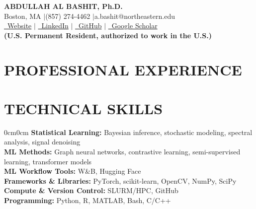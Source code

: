 \documentclass[11pt, letterpaper]{article}
\newlength{\sectionContentAfterSkip}
\newlength{\itemSpacing}
\newlength{\headerAfterSkip}
\newenvironment{onecolentry}{
  \begin{adjustwidth}{0cm}{0cm}
}{
  \end{adjustwidth}
}
\newenvironment{sectioncontent}{
  \par\begin{list}{}{
    \setlength{\leftmargin}{0pt}
    \setlength{\rightmargin}{0pt}
    \setlength{\topsep}{0pt}
    \setlength{\partopsep}{0pt}
    \setlength{\parsep}{0pt}
    \setlength{\itemsep}{0pt}
  }\item\relax
}{
  \removelastskip
  \end{list}
  \vspace{\sectionContentAfterSkip}
  \par
}
\newcommand{\skillitem}[1]{%
  \begin{onecolentry}#1\end{onecolentry}%
  \vspace{\itemSpacing}%
}
\begin{document}
\begin{center}
    {\fontsize{16}{20}\selectfont\bfseries\color{burgundy}ABDULLAH AL BASHIT, Ph.D.}\\[0.2em]
    {\small Boston, MA \enspace$|$\enspace (857) 274-4462 \enspace$|$\enspace a.bashit@northeastern.edu}\\[0.2em]
    {\small \href{https://abdullah-al-bashit.github.io/}{\textcolor{burgundy}{\faGlobe~Website}} \enspace$|$\enspace%
    \href{https://www.linkedin.com/in/abdullah-al-bashit/}{\textcolor{burgundy}{\faLinkedin~LinkedIn}} \enspace$|$\enspace%
    \href{https://github.com/abdullah-al-bashit}{\textcolor{burgundy}{\faGithub~GitHub}} \enspace$|$\enspace%
    \href{https://scholar.google.com/citations?user=w3KyQbkAAAAJ&hl=en}{\textcolor{burgundy}{\faGraduationCap~Google Scholar}}}\\[0.2em]
        {\small \textbf{(U.S. Permanent Resident, authorized to work in the U.S.)}}
\end{center}
\vspace{\headerAfterSkip}

\section{PROFESSIONAL EXPERIENCE}
\begin{sectioncontent}

\expVesselSeg     %
\expPostdocXray   %
\expPhDXray       %
\expCryoET        %
\newpage
\expCOPD          %
\expToad          %


\end{sectioncontent}



\section{TECHNICAL SKILLS}
\begin{sectioncontent}

\skillitem{%
\textbf{Statistical Learning:} Bayesian inference, stochastic modeling, spectral analysis, signal denoising\\[3pt]%

\textbf{ML Methods:} Graph neural networks, contrastive learning, semi-supervised learning, transformer models\\[3pt]%

\textbf{ML Workflow Tools:} W\&B, Hugging Face\\[3pt]%

\textbf{Frameworks \& Libraries:} PyTorch, scikit-learn, OpenCV, NumPy, SciPy\\[3pt]%

\textbf{Compute \& Version Control:} SLURM/HPC, GitHub\\[3pt]%

\textbf{Programming:} Python, R, MATLAB, Bash, C/C++%


}
\end{sectioncontent}
\end{document}
